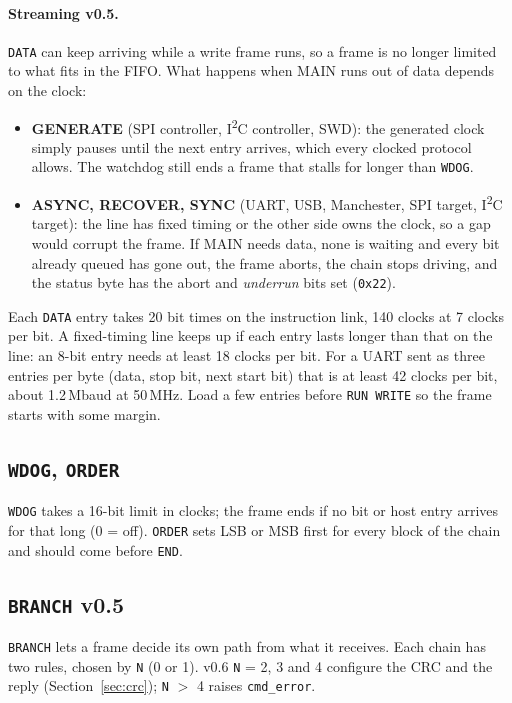 \documentclass[11pt,a4paper]{article}
\newcommand{\vfive}{\textcolor{fivec}{\textsf{\small v0.5}}}
\newcommand{\vsix}{\textcolor{sixc}{\textsf{\small v0.6}}}
\newcommand{\sig}[1]{\texttt{#1}}
\begin{document}
\paragraph{Streaming \vfive.} \sig{DATA} can keep arriving while a write frame runs, so a frame is no longer limited to what fits in the FIFO. What happens when MAIN runs out of data depends on the clock:
\begin{itemize}
\item \textbf{GENERATE} (SPI controller, I\textsuperscript{2}C controller, SWD): the generated clock simply pauses until the next entry arrives, which every clocked protocol allows. The watchdog still ends a frame that stalls for longer than \sig{WDOG}.
\item \textbf{ASYNC, RECOVER, SYNC} (UART, USB, Manchester, SPI target, I\textsuperscript{2}C target): the line has fixed timing or the other side owns the clock, so a gap would corrupt the frame. If MAIN needs data, none is waiting and every bit already queued has gone out, the frame aborts, the chain stops driving, and the status byte has the abort and \emph{underrun} bits set (\texttt{0x22}).
\end{itemize}
Each \sig{DATA} entry takes 20 bit times on the instruction link, 140 clocks at 7 clocks per bit. A fixed-timing line keeps up if each entry lasts longer than that on the line: an 8-bit entry needs at least 18 clocks per bit. For a UART sent as three entries per byte (data, stop bit, next start bit) that is at least 42 clocks per bit, about 1.2\,Mbaud at 50\,MHz. Load a few entries before \sig{RUN WRITE} so the frame starts with some margin.

\subsection{\sig{WDOG}, \sig{ORDER}}

\sig{WDOG} takes a 16-bit limit in clocks; the frame ends if no bit or host entry arrives for that long (0 = off). \sig{ORDER} sets LSB or MSB first for every block of the chain and should come before \sig{END}.

\subsection{\sig{BRANCH} \vfive}\label{sec:branch}

\sig{BRANCH} lets a frame decide its own path from what it receives. Each chain has two rules, chosen by \sig{N} (0 or 1). \vsix{} \sig{N} = 2, 3 and 4 configure the CRC and the reply (Section~\ref{sec:crc}); \sig{N} $>$ 4 raises \sig{cmd\_error}.
\end{document}
